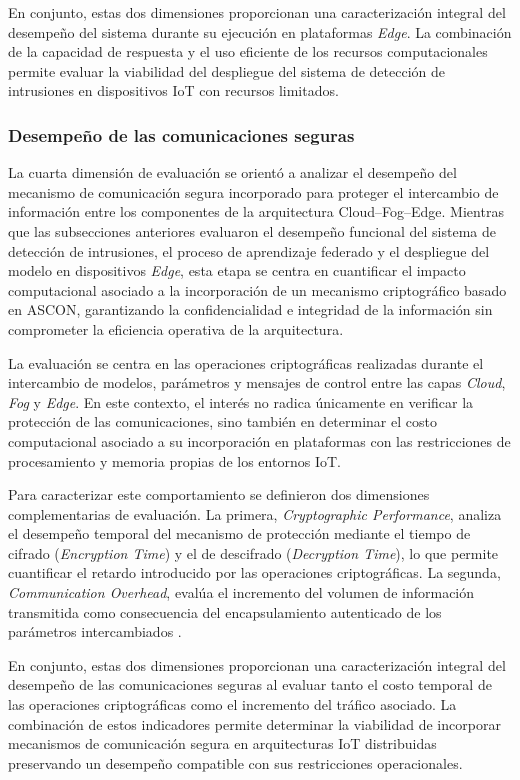 \documentclass[journal,article,submit,moreauthors]{Definitions/mdpi}
\begin{document}
En conjunto, estas dos dimensiones proporcionan una caracterización integral del desempeño del sistema durante su ejecución en plataformas \textit{Edge}. La combinación de la capacidad de respuesta y el uso eficiente de los recursos computacionales permite evaluar la viabilidad del despliegue del sistema de detección de intrusiones en dispositivos IoT con recursos limitados.

\subsubsection{Desempeño de las comunicaciones seguras}
La cuarta dimensión de evaluación se orientó a analizar el desempeño del mecanismo de comunicación segura incorporado para proteger el intercambio de información entre los componentes de la arquitectura Cloud--Fog--Edge. Mientras que las subsecciones anteriores evaluaron el desempeño funcional del sistema de detección de intrusiones, el proceso de aprendizaje federado y el despliegue del modelo en dispositivos \textit{Edge}, esta etapa se centra en cuantificar el impacto computacional asociado a la incorporación de un mecanismo criptográfico basado en ASCON, garantizando la confidencialidad e integridad de la información sin comprometer la eficiencia operativa de la arquitectura.

La evaluación se centra en las operaciones criptográficas realizadas durante el intercambio de modelos, parámetros y mensajes de control entre las capas \textit{Cloud}, \textit{Fog} y \textit{Edge}. En este contexto, el interés no radica únicamente en verificar la protección de las comunicaciones, sino también en determinar el costo computacional asociado a su incorporación en plataformas con las restricciones de procesamiento y memoria propias de los entornos IoT.

Para caracterizar este comportamiento se definieron dos dimensiones complementarias de evaluación. La primera, \textit{Cryptographic Performance}, analiza el desempeño temporal del mecanismo de protección mediante el tiempo de cifrado (\textit{Encryption Time}) y el de descifrado (\textit{Decryption Time}), lo que permite cuantificar el retardo introducido por las operaciones criptográficas. La segunda, \textit{Communication Overhead}, evalúa el incremento del volumen de información transmitida como consecuencia del encapsulamiento autenticado de los parámetros intercambiados \cite{Sorescu2025,Alshammari2026}.

En conjunto, estas dos dimensiones proporcionan una caracterización integral del desempeño de las comunicaciones seguras al evaluar tanto el costo temporal de las operaciones criptográficas como el incremento del tráfico asociado. La combinación de estos indicadores permite determinar la viabilidad de incorporar mecanismos de comunicación segura en arquitecturas IoT distribuidas preservando un desempeño compatible con sus restricciones operacionales.
\end{document}
